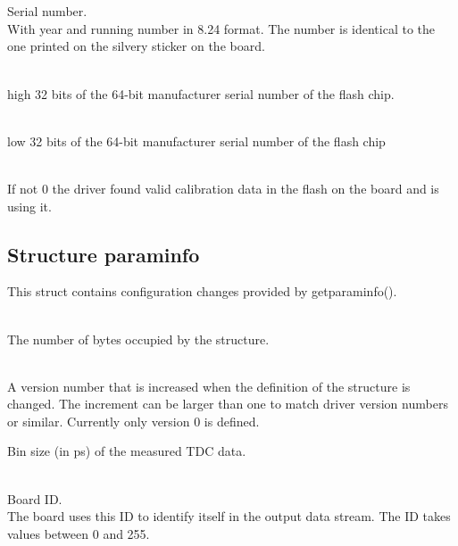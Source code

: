 			\\
			\par

			\\
			Serial number.\\
			With year and running number in 8.24 format. The number is identical to the one printed on the silvery sticker on the board.\par

			\\
			high 32 bits of the 64-bit manufacturer serial number of the flash chip.

			\\
			low 32 bits of the 64-bit manufacturer serial number of the flash chip

			\\
			If not 0 the driver found valid calibration data in the flash on the board and is using it.\par

		\subsection{Structure \prefix param\tu info}
			This struct contains configuration changes provided by \textsf{\prefix get\tu param\tu info()}.

			\\
			The number of bytes occupied by the structure. \par

			\\
			A version number that is increased when the definition of the structure is changed. The increment can be larger than one to match driver version numbers or similar. Currently only version 0 is defined.\par


			Bin size (in ps) of the measured TDC data.

			\\
			Board ID.\\
			The board uses this ID to identify itself in the output data stream. The ID takes values between 0 and 255.\par

